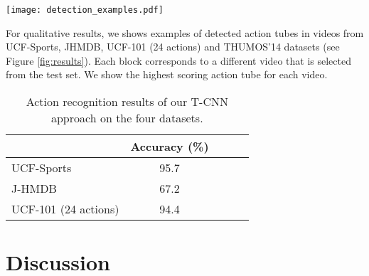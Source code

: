 \documentclass[10pt,twocolumn,letterpaper]{article}
\begin{document}
\begin{figure*}[!t]
\centering
\texttt{[image: detection\_examples.pdf]}
\caption{Action detection results by T-CNN on UCF-Sports, JHMDB, UCF-101 and THUMOS'14. Red boxes indicate the detections in the corresponding frames, and green boxes denote ground truth. The predicted label is overlaid. }
\label{fig:results}
\end{figure*}

For qualitative results, we shows examples of detected action tubes in videos from UCF-Sports, JHMDB, UCF-101 (24 actions) and THUMOS'14 datasets (see Figure \ref{fig:results}). Each block corresponds to a different video that is selected from the test set. We show the highest scoring action tube for each video.



\begin{table}[!tb]
\begin{center}
\small
\begin{tabular}{lcccc}
\hline
                        & Accuracy (\%)  \\
\hline
UCF-Sports              & 95.7  \\
J-HMDB                  & 67.2       \\
UCF-101 (24 actions)    & 94.4   \\
\hline

\end{tabular}
\caption{Action recognition results of our T-CNN approach on the four datasets.}
\label{tab:rec}
\end{center}
\end{table}

\section{Discussion}
\label{sec:discussion}
\end{document}
